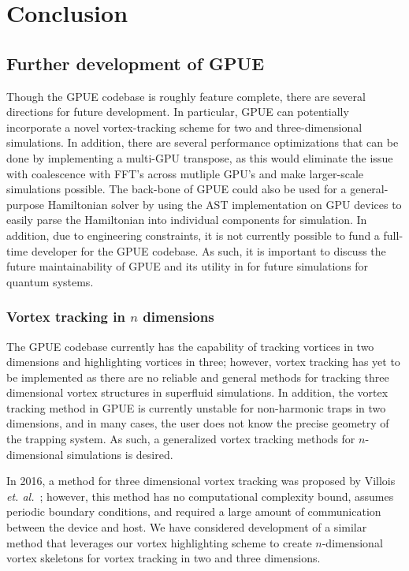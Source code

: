 \chapter*{Conclusion}
\label{ch:conclusion}

\section{Further development of GPUE}

Though the GPUE codebase is roughly feature complete, there are several directions for future development.
In particular, GPUE can potentially incorporate a novel vortex-tracking scheme for two and three-dimensional simulations.
In addition, there are several performance optimizations that can be done by implementing a multi-GPU transpose, as this would eliminate the issue with coalescence with FFT's across mutliple GPU's and make larger-scale simulations possible.
The back-bone of GPUE could also be used for a general-purpose Hamiltonian solver by using the AST implementation on GPU devices to easily parse the Hamiltonian into individual components for simulation.
In addition, due to engineering constraints, it is not currently possible to fund a full-time developer for the GPUE codebase.
As such, it is important to discuss the future maintainability of GPUE and its utility in for future simulations for quantum systems.

\subsection{Vortex tracking in $n$ dimensions}

The GPUE codebase currently has the capability of tracking vortices in two dimensions and highlighting vortices in three; however, vortex tracking has yet to be implemented as there are no reliable and general methods for tracking three dimensional vortex structures in superfluid simulations.
In addition, the vortex tracking method in GPUE is currently unstable for non-harmonic traps in two dimensions, and in many cases, the user does not know the precise geometry of the trapping system.
As such, a generalized vortex tracking methods for $n$-dimensional simulations is desired.

In 2016, a method for three dimensional vortex tracking was proposed by Villois \textit{et. al.}~\cite{villois2016}; however, this method has no computational complexity bound, assumes periodic boundary conditions, and required a large amount of communication between the device and host.
We have considered development of a similar method that leverages our vortex highlighting scheme to create $n$-dimensional vortex skeletons for vortex tracking in two and three dimensions.

